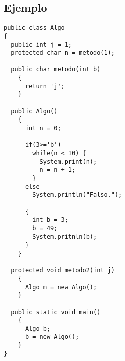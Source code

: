 \documentclass [a4paper,abstracton,titlepage]{scrartcl}
\begin{document}
\subsection{Ejemplo}

\begin{lstlisting}
public class Algo
{
  public int j = 1;
  protected char n = metodo(1);

  public char metodo(int b)
    {
      return 'j';
    }

  public Algo()
    {
      int n = 0;

      if(3>='b')
        while(n < 10) {
          System.print(n);
          n = n + 1;
        }
      else
        System.println("Falso.");

      {
        int b = 3;
        b = 49;
        System.pritnln(b);
      }
    }

  protected void metodo2(int j)
    {
      Algo m = new Algo();
    }

  public static void main()
    {
      Algo b;
      b = new Algo();
    }
}
\end{lstlisting}
\end{document}
